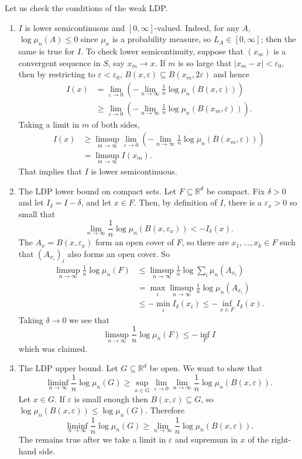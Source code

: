 \documentclass[10pt]{article}
\newcommand{\RR}{\mathbb{R}}
\theoremstyle{definition}
\begin{document}
Let us check the conditions of the weak LDP.
\begin{enumerate}
\item $I$ is lower semicontinuous and $[0, \infty]$-valued. Indeed, for any $A$, $\log \mu_n(A) \leq 0$ since $\mu_n$ is a probability measure, so $L_A \in [0, \infty]$; then the same is true for $I$.
To check lower semicontinuity, suppose that $(x_m)$ is a convergent sequence in $S$, say $x_m \to x$.
If $m$ is so large that $|x_m - x| < \varepsilon_0$, then by restricting to $\varepsilon < \varepsilon_0$, $B(x, \varepsilon) \subseteq B(x_m, 2\varepsilon)$ and hence
\begin{align*}
I(x) &= \lim_{\varepsilon \to 0}\left(- \lim_{n \to \infty} \frac{1}{n} \log \mu_n(B(x, \varepsilon))\right)\\
&\geq \lim_{\varepsilon \to 0}\left( -\lim_{n \to \infty} \frac{1}{n} \log \mu_n(B(x_m, \varepsilon))\right).
\end{align*}
Taking a limit in $m$ of both sides,
\begin{align*}
I(x) &\geq \limsup_{m \to \infty}\lim_{\varepsilon \to 0}\left( - \lim_{n \to \infty} \frac{1}{n} \log \mu_n(B(x_m, \varepsilon))\right)\\
&= \limsup_{m \to \infty} I(x_m).
\end{align*}
That implies that $I$ is lower semicontinuous.
\item The LDP lower bound on compact sets. Let $F \subseteq \RR^d$ be compact. Fix $\delta > 0$ and let $I_\delta = I - \delta$, and let $x \in F$.
Then, by definition of $I$, there is a $\varepsilon_x > 0$ so small that
$$\lim_{n \to \infty} \frac{1}{n} \log \mu_n(B(x, \varepsilon_x)) < -I_\delta(x).$$
The $A_x = B(x, \varepsilon_x)$ form an open cover of $F$, so there are $x_1, \dots, x_k \in F$ such that $(A_{x_i})_i$ also forms an open cover.
So
\begin{align*}
\limsup_{n \to \infty} \frac{1}{n} \log \mu_n(F)& \leq \limsup_{n \to \infty} \frac{1}{n} \log \sum_i \mu_n(A_{x_i})\\
&= \max_i \limsup_{n \to \infty} \frac{1}{n} \log \mu_n(A_{x_i})\\
&\leq -\min_i I_\delta(x_i) \leq -\inf_{x \in F} I_\delta(x).
\end{align*}
Taking $\delta \to 0$ we see that
$$\limsup_{n \to \infty} \frac{1}{n} \log \mu_n(F) \leq -\inf_F I$$
which was claimed.
\item The LDP upper bound. Let $G \subseteq \RR^d$ be open. We want to show that
$$\liminf_{n \to \infty} \frac{1}{n} \log \mu_n(G) \geq \sup_{x \in G}\lim_{\varepsilon \to 0} \lim_{n \to \infty} \frac{1}{n} \log \mu_n(B(x, \varepsilon)).$$
Let $x \in G$. If $\varepsilon$ is small enough then $B(x, \varepsilon) \subseteq G$, so $\log \mu_n(B(x, \varepsilon)) \leq \log \mu_n(G)$.
Therefore
$$\liminf_{n \to \infty} \frac{1}{n} \log \mu_n(G) \geq \lim_{n \to \infty} \frac{1}{n} \log \mu_n(B(x, \varepsilon)).$$
The remains true after we take a limit in $\varepsilon$ and supremum in $x$ of the right-hand side.
\end{enumerate}
\end{document}
